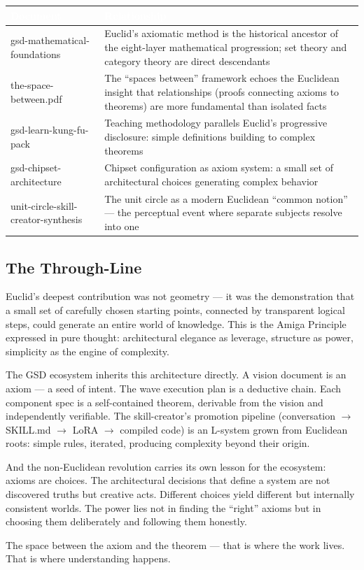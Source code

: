 \documentclass[11pt,letterpaper]{article}
\newcommand{\tableheader}[1]{\textbf{\sffamily\textcolor{white}{#1}}}
\begin{document}
\begin{center}
\begin{tabularx}{\textwidth}{L{4.5cm}X}
\toprule
{}
\tableheader{Document} & \tableheader{Relationship} \\
\midrule
gsd-mathematical-foundations & Euclid's axiomatic method is the historical ancestor of the eight-layer mathematical progression; set theory and category theory are direct descendants \\
the-space-between.pdf & The ``spaces between'' framework echoes the Euclidean insight that relationships (proofs connecting axioms to theorems) are more fundamental than isolated facts \\
gsd-learn-kung-fu-pack & Teaching methodology parallels Euclid's progressive disclosure: simple definitions building to complex theorems \\
gsd-chipset-architecture & Chipset configuration as axiom system: a small set of architectural choices generating complex behavior \\
unit-circle-skill-creator-synthesis & The unit circle as a modern Euclidean ``common notion'' --- the perceptual event where separate subjects resolve into one \\
\bottomrule
\end{tabularx}
\end{center}

\subsection{The Through-Line}

\begin{quotebox}
Euclid's deepest contribution was not geometry --- it was the demonstration that a small set of carefully chosen starting points, connected by transparent logical steps, could generate an entire world of knowledge. This is the Amiga Principle expressed in pure thought: architectural elegance as leverage, structure as power, simplicity as the engine of complexity.

The GSD ecosystem inherits this architecture directly. A vision document is an axiom --- a seed of intent. The wave execution plan is a deductive chain. Each component spec is a self-contained theorem, derivable from the vision and independently verifiable. The skill-creator's promotion pipeline (conversation $\rightarrow$ SKILL.md $\rightarrow$ LoRA $\rightarrow$ compiled code) is an L-system grown from Euclidean roots: simple rules, iterated, producing complexity beyond their origin.

And the non-Euclidean revolution carries its own lesson for the ecosystem: axioms are choices. The architectural decisions that define a system are not discovered truths but creative acts. Different choices yield different but internally consistent worlds. The power lies not in finding the ``right'' axioms but in choosing them deliberately and following them honestly.

The space between the axiom and the theorem --- that is where the work lives. That is where understanding happens.
\end{quotebox}
\end{document}
